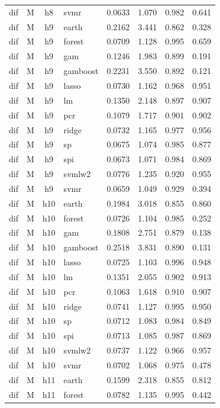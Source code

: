 \begin{ThreePartTable}
\begin{longtable}[t]{llclcccc}
dif & M & h8 & svmr & 0.0633 & 1.070 & 0.982 & 0.641\\
\addlinespace
dif & M & h9 & earth & 0.2162 & 3.441 & 0.862 & 0.328\\
dif & M & h9 & forest & 0.0709 & 1.128 & 0.995 & 0.659\\
dif & M & h9 & gam & 0.1246 & 1.983 & 0.899 & 0.191\\
dif & M & h9 & gamboost & 0.2231 & 3.550 & 0.892 & 0.121\\
dif & M & h9 & lasso & 0.0730 & 1.162 & 0.968 & 0.951\\
dif & M & h9 & lm & 0.1350 & 2.148 & 0.897 & 0.907\\
dif & M & h9 & pcr & 0.1079 & 1.717 & 0.901 & 0.902\\
dif & M & h9 & ridge & 0.0732 & 1.165 & 0.977 & 0.956\\
dif & M & h9 & sp & 0.0675 & 1.074 & 0.985 & 0.877\\
dif & M & h9 & spi & 0.0673 & 1.071 & 0.984 & 0.869\\
dif & M & h9 & svmlw2 & 0.0776 & 1.235 & 0.920 & 0.955\\
dif & M & h9 & svmr & 0.0659 & 1.049 & 0.929 & 0.394\\
\addlinespace
dif & M & h10 & earth & 0.1984 & 3.018 & 0.855 & 0.860\\
dif & M & h10 & forest & 0.0726 & 1.104 & 0.985 & 0.252\\
dif & M & h10 & gam & 0.1808 & 2.751 & 0.879 & 0.138\\
dif & M & h10 & gamboost & 0.2518 & 3.831 & 0.890 & 0.131\\
dif & M & h10 & lasso & 0.0725 & 1.103 & 0.996 & 0.948\\
dif & M & h10 & lm & 0.1351 & 2.055 & 0.902 & 0.913\\
dif & M & h10 & pcr & 0.1063 & 1.618 & 0.910 & 0.907\\
dif & M & h10 & ridge & 0.0741 & 1.127 & 0.995 & 0.950\\
dif & M & h10 & sp & 0.0712 & 1.083 & 0.984 & 0.849\\
dif & M & h10 & spi & 0.0713 & 1.085 & 0.987 & 0.869\\
dif & M & h10 & svmlw2 & 0.0737 & 1.122 & 0.966 & 0.957\\
dif & M & h10 & svmr & 0.0702 & 1.068 & 0.975 & 0.478\\
\addlinespace
dif & M & h11 & earth & 0.1599 & 2.318 & 0.855 & 0.812\\
dif & M & h11 & forest & 0.0782 & 1.135 & 0.995 & 0.442\\

\end{longtable}
\end{ThreePartTable}
